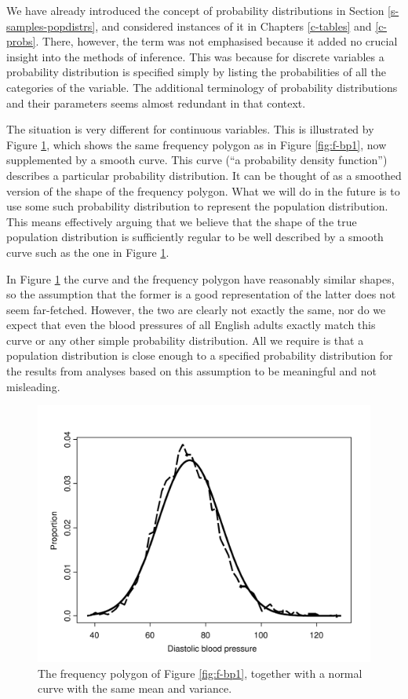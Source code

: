 \documentclass[11pt,a4paper,openany]{book}
\begin{document}
We have already introduced the concept of probability distributions in
Section \ref{s-samples-popdistrs}, and considered instances of it in
Chapters \ref{c-tables} and \ref{c-probs}. There, however, the term was
not emphasised because it added no crucial insight into the methods of
inference. This was because for discrete variables a probability
distribution is specified simply by listing the probabilities of all the
categories of the variable. The additional terminology of probability
distributions and their parameters seems almost redundant in that
context.

The situation is very different for continuous variables. This is
illustrated by Figure \ref{fig:f-bp2}, which shows the same frequency
polygon as in Figure \ref{fig:f-bp1}, now supplemented by a smooth
curve. This curve (``a probability density function'') describes a
particular probability distribution. It can be thought of as a smoothed
version of the shape of the frequency polygon. What we will do in the
future is to use some such probability distribution to represent the
population distribution. This means effectively arguing that we believe
that the shape of the true population distribution is sufficiently
regular to be well described by a smooth curve such as the one in Figure
\ref{fig:f-bp2}.

In Figure \ref{fig:f-bp2} the curve and the frequency polygon have
reasonably similar shapes, so the assumption that the former is a good
representation of the latter does not seem far-fetched. However, the two
are clearly not exactly the same, nor do we expect that even the blood
pressures of all English adults exactly match this curve or any other
simple probability distribution. All we require is that a population
distribution is close enough to a specified probability distribution for
the results from analyses based on this assumption to be meaningful and
not misleading.

\begin{figure}[htbp]
\centering
\includegraphics[width=11.50000cm]{bloodp2.pdf}
\caption{\label{fig:f-bp2} The frequency polygon of Figure \ref{fig:f-bp1},
together with a normal curve with the same mean and variance.}
\end{figure}
\end{document}
